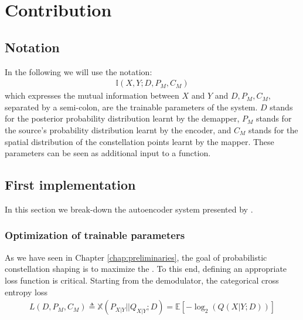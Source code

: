 \chapter{Contribution}\label{chap:contribution}
\section{Notation}
In the following we will use the notation:
\begin{align*}
	\mathbb{I} \left(X , Y; D, P_M, C_M \right)
\end{align*}
which expresses the mutual information between $X$ and $Y$ and $D, P_M, C_M$, separated by a semi-colon, are the trainable parameters of the system. $D$ stands for the posterior probability distribution learnt by the demapper, $P_M$ stands for the source's probability distribution learnt by the encoder, and $C_M$ stands for the spatial distribution of the constellation points learnt by the mapper. These parameters can be seen as additional input to a function.

\section{First implementation}
In this section we break-down the autoencoder system presented by \citet{Stark}.
\subsection{Optimization of trainable parameters}
As we have seen in Chapter \ref{chap:preliminaries}, the goal of probabilistic constellation shaping is to maximize the . To this end, defining an appropriate loss function is critical. Starting from the demodulator, the categorical cross entropy loss
\begin{align}
	L(D, P_M, C_M) \triangleq \mathbb{X}(P_{X|Y}||Q_{X|Y}; D) = \mathbb{E}\left[-\log_2(Q(X|Y;D))\right] 
	\label{eqn:init_loss}
\end{align}

